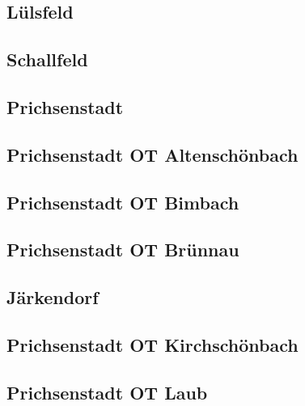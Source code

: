 \documentclass[fontsize=12pt,a4paper]{scrreprt}
\begin{document}
            \subsection{Lülsfeld}
            

            \subsection{Schallfeld}
            

            \subsection{Prichsenstadt}
            

            \subsection{Prichsenstadt OT Altenschönbach}
            

            \subsection{Prichsenstadt OT Bimbach} 
            

            \subsection{Prichsenstadt OT Brünnau}
            

            \subsection{Järkendorf}
            

            \subsection{Prichsenstadt OT Kirchschönbach}
            

            \subsection{Prichsenstadt OT Laub}
            
\end{document}
